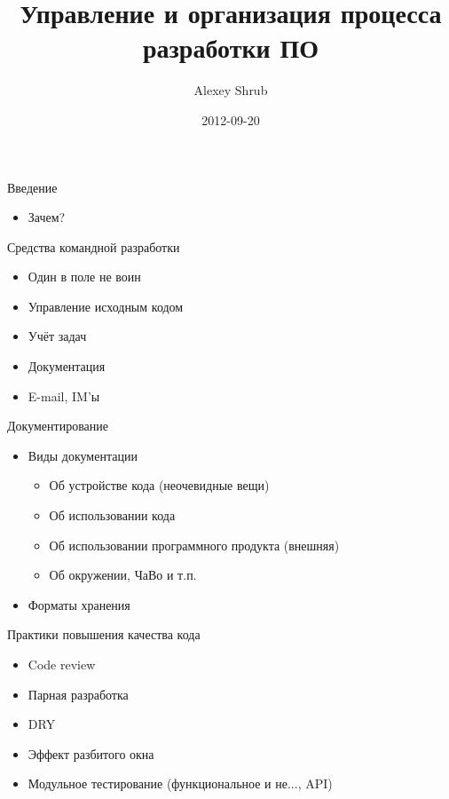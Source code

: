 \documentclass[aspectratio=169]{beamer}
\title{Управление и организация процесса разработки ПО}
\author{Alexey Shrub}
\date{2012-09-20}
\begin{document}
\maketitle

\begin{frame}{Введение}
\begin{itemize}
\item Зачем?
\end{itemize}
\end{frame}

\begin{frame}{Средства командной разработки}
\begin{itemize}
\item Один в поле не воин
\pause
\item Управление исходным кодом
\pause
\item Учёт задач
\pause
\item Документация
\pause
\item E-mail, IM'ы
\end{itemize}
\end{frame}

\begin{frame}{Документирование}
\begin{itemize}
\item Виды документации
\begin{itemize}
\item Об устройстве кода (неочевидные вещи)
\pause
\item Об использовании кода
\pause
\item Об использовании программного продукта (внешняя)
\pause
\item Об окружении, ЧаВо и т.п.
\end{itemize}
\pause
\item Форматы хранения
\end{itemize}
\end{frame}

\begin{frame}{Практики повышения качества кода}
\begin{itemize}
\item Code review
\pause
\item Парная разработка
\pause
\item DRY
\pause
\item Эффект разбитого окна
\pause
\item Модульное тестирование (функциональное и не..., API)
\end{itemize}
\end{frame}
\end{document}
